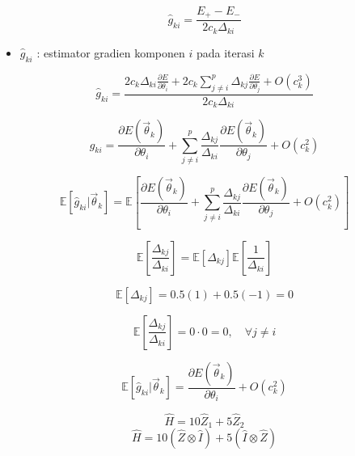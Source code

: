 \begin{equation}
    \hat{g}_{ki} = \frac{E_+ - E_-}{2 c_k \Delta_{ki}}
\end{equation}
\begin{itemize}
    \item $\hat{g}_{ki}$ : estimator gradien komponen $i$ pada iterasi $k$
\end{itemize}

\begin{equation}
    \hat{g}_{ki} = \frac{2 c_k \Delta_{ki} \frac{\partial E}{\partial \theta_i} + 2 c_k \sum_{j \neq i}^p \Delta_{kj} \frac{\partial E}{\partial \theta_j} + O(c_k^3)}{2 c_k \Delta_{ki}}
\end{equation}

\begin{equation}
    \hat{g}_{ki} = \frac{\partial E(\vec{\theta}_k)}{\partial \theta_i} + \sum_{j \neq i}^p \frac{\Delta_{kj}}{\Delta_{ki}} \frac{\partial E(\vec{\theta}_k)}{\partial \theta_j} + O(c_k^2)
\end{equation}

\begin{equation}
    \mathbb{E}[\hat{g}_{ki} | \vec{\theta}_k] = \mathbb{E} \left[ \frac{\partial E(\vec{\theta}_k)}{\partial \theta_i} + \sum_{j \neq i}^p \frac{\Delta_{kj}}{\Delta_{ki}} \frac{\partial E(\vec{\theta}_k)}{\partial \theta_j} + O(c_k^2) \right]
\end{equation}

\begin{equation}
    \mathbb{E} \left[ \frac{\Delta_{kj}}{\Delta_{ki}} \right] = \mathbb{E}[\Delta_{kj}] \mathbb{E} \left[ \frac{1}{\Delta_{ki}} \right]
\end{equation}

\begin{equation}
    \mathbb{E}[\Delta_{kj}] = 0.5(1) + 0.5(-1) = 0
\end{equation}

\begin{equation}
    \mathbb{E} \left[ \frac{\Delta_{kj}}{\Delta_{ki}} \right] = 0 \cdot 0 = 0, \quad \forall j \neq i
\end{equation}

\begin{equation}
    \mathbb{E}[\hat{g}_{ki} | \vec{\theta}_k] = \frac{\partial E(\vec{\theta}_k)}{\partial \theta_i} + O(c_k^2)
\end{equation}

\begin{equation}
    \hat{H} = 10 \hat{Z}_1 + 5 \hat{Z}_2
\end{equation}
\begin{equation}
    \hat{H} = 10 (\hat{Z} \otimes \hat{I}) + 5 (\hat{I} \otimes \hat{Z})
\end{equation}

